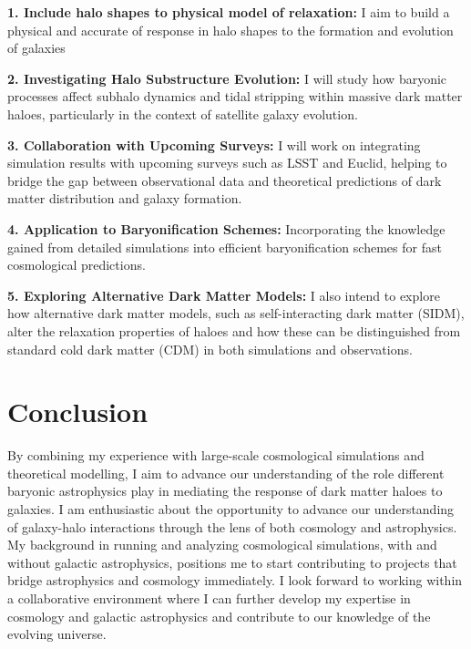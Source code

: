\documentclass[10pt]{article}
\begin{document}
\textbf{1. Include halo shapes to physical model of relaxation:}  
I aim to build a physical and accurate of response in halo shapes to the formation and evolution of galaxies

\textbf{2. Investigating Halo Substructure Evolution:}  
I will study how baryonic processes affect subhalo dynamics and tidal stripping within massive dark matter haloes, particularly in the context of satellite galaxy evolution.

\textbf{3. Collaboration with Upcoming Surveys:}  
I will work on integrating simulation results with upcoming surveys such as LSST and Euclid, helping to bridge the gap between observational data and theoretical predictions of dark matter distribution and galaxy formation.

\textbf{4. Application to Baryonification Schemes:}  
Incorporating the knowledge gained from detailed simulations into efficient baryonification schemes for fast cosmological predictions.

\textbf{5. Exploring Alternative Dark Matter Models:}  
I also intend to explore how alternative dark matter models, such as self-interacting dark matter (SIDM), alter the relaxation properties of haloes and how these can be distinguished from standard cold dark matter (CDM) in both simulations and observations.

\section{Conclusion}
By combining my experience with large-scale cosmological simulations and theoretical modelling, I aim to advance our understanding of the role different baryonic astrophysics play in mediating the response of dark matter haloes to galaxies. I am enthusiastic about the opportunity to advance our understanding of galaxy-halo interactions through the lens of both cosmology and astrophysics. My background in running and analyzing cosmological simulations, with and without galactic astrophysics, positions me to start contributing to projects that bridge astrophysics and cosmology immediately. I look forward to working within a collaborative environment where I can further develop my expertise in cosmology and galactic astrophysics and contribute to our knowledge of the evolving universe.

\printbibliography
\end{document}
